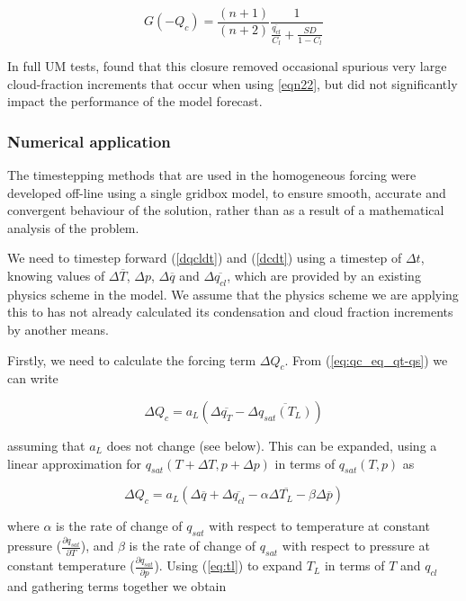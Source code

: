 \documentclass{UMDP_article}
\begin{document}
\begin{equation}
G(-Q_c) = \frac{(n+1)}{(n+2)} \frac{ 1
          }{ \frac{\overline{q_{cl}}}{C_l} + \frac{SD}{1-C_l} }
\label{eq:gmqc_width}
\end{equation}

In full UM tests, \cite{morcrette_2020} found that this closure removed
occasional spurious very large cloud-fraction increments that occur when
using \ref{eqn22}, but did not significantly impact the performance of the
model forecast.

\subsubsection{Numerical application}
\label{sec:homog_num_app}

The timestepping methods that are used in the homogeneous forcing were
developed off-line using a single gridbox model, to ensure smooth,
accurate and convergent behaviour of the solution, rather than as a result
of a mathematical analysis of the problem.

We need to timestep forward (\ref{dqcldt}) and (\ref{dcdt}) using a
timestep of $\Delta{t}$, knowing values of $\Delta{\overline{T}}$, $\Delta{p}$,
$\Delta{\overline{q}}$ and $\Delta{\overline{q_{cl}}}$, which are provided
by an existing physics scheme in the model. We assume that the physics scheme
we are applying this to has not already calculated its condensation
and cloud fraction increments by another means.

Firstly, we need to calculate the forcing term $\Delta{Q_c}$. From
(\ref{eq:qc_eq_qt-qs}) we can write

\begin{equation}
\Delta{Q_c} = a_L ( \Delta{\overline{q_T}} - \Delta{\overline{q_{sat}(T_L)}} )
\label{eq:deltaqc}
\end{equation}

assuming that $a_L$ does not change (see below). This can be expanded,
using a linear approximation for
$q_{sat}(T+\Delta{T},p+\Delta{p})$ in terms of  $q_{sat}(T,p)$ as

\begin{equation}
\Delta{Q_c} = a_L ( \Delta{\overline{q}} + \Delta{\overline{q_{cl}}}
- \alpha \Delta{\overline{T_L}}
- \beta \Delta{\overline{p}} )
\label{eq:deltaqc_exp}
\end{equation}

where $\alpha$ is the rate of change of $q_{sat}$ with
respect to temperature at
constant pressure ($\frac{\partial q_{sat}}{\partial T}$),
and $\beta$ is the rate of change of $q_{sat}$
with respect to pressure at constant temperature
($\frac{\partial q_{sat}}{\partial p}$). Using (\ref{eq:tl}) to expand $T_L$ in terms
of $T$ and $q_{cl}$ and gathering terms together we obtain
\end{document}
